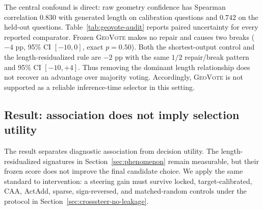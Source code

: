 The central confound is direct: raw geometry confidence has Spearman correlation
$0.830$ with generated length on calibration questions and $0.742$ on the held-out
questions.  Table~\ref{tab:geovote-audit} reports paired uncertainty for every
reported comparator.  Frozen
\textsc{GeoVote} makes no repair and causes two breaks ($-4$ pp, 95\% CI
$[-10,0]$, exact $p=0.50$).  Both the shortest-output control and the
length-residualized rule are $-2$ pp with the same $1/2$ repair/break pattern and
95\% CI $[-10,+4]$.  Thus removing the dominant length relationship does not
recover an advantage over majority voting.  Accordingly, \textsc{GeoVote} is not supported as a reliable inference-time
selector in this setting.

\subsection{Result: association does not imply selection utility}

The result separates diagnostic association from decision utility.  The
length-residualized signatures in Section~\ref{sec:phenomenon} remain measurable,
but their frozen score does not improve the final candidate choice.  We apply the
same standard to intervention: a steering gain must survive locked,
target-calibrated, CAA, ActAdd, sparse, sign-reversed, and matched-random
controls under the protocol in
Section~\ref{sec:crosssteer-no-leakage}.
